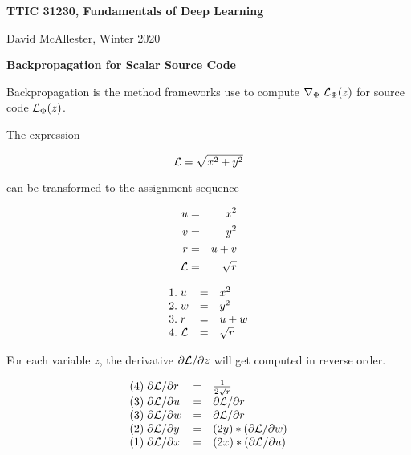 




{\Huge
  
  \centerline{\bf TTIC 31230, Fundamentals of Deep Learning}
  \bigskip
  \centerline{David McAllester, Winter 2020}
  \vfill
  \vfill
  \centerline{\bf Backpropagation for Scalar Source Code}
  \vfill
  \vfill


Backpropagation is the method frameworks use to compute $\nabla_\Phi\;{\cal L}_\Phi(z)$
for source code ${\cal L}_\Phi(z)$.


The expression

\vfill
{\color{red} $${\cal L} = \sqrt{x^2 + y^2}$$}

\vfill
can be transformed to the assignment sequence

{\color{red}
\vfill
\begin{eqnarray*}
  u & = & x^2  \\
  v & = & y^2 \\
  r & =& u + v \\
  {\cal L} & = & \sqrt{r}
\end{eqnarray*}
}

\vspace{-1ex}
{\color{red}
$$\begin{array}{lcl}
 1.\;u & = & x^2  \\
 2.\;w & = & y^2 \\
 3.\;r & =& u + w \\
  4.\;{\cal L} & = & \sqrt{r}
\end{array}$$
}

\vfill
For each variable $z$, the derivative $\partial {\cal L}/\partial z$ will get computed in reverse order.

\vfill
{\color{red}
$$\begin{array}{lcl}
(4)\; \partial{\cal L}/\partial r & = & \frac{1}{2\sqrt{r}} \\
(3)\; \partial{\cal L}/\partial u & = & \partial {\cal L}/\partial r \\
(3)\; \partial{\cal L}/\partial w & = & \partial {\cal L}/\partial r\\
(2)\; \partial{\cal L}/\partial y & = &  (2y) * (\partial {\cal L}/\partial w) \\
(1)\; \partial{\cal L}/\partial x & = & (2x) * (\partial {\cal L}/\partial u)
\end{array}$$
}

}
